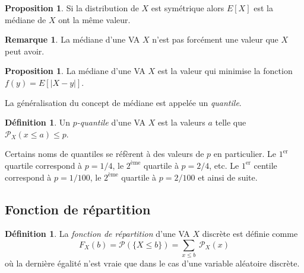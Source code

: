 \documentclass[a4paper,12pt]{report}
\theoremstyle{definition}
\renewcommand{\(}{\left(}
\renewcommand{\)}{\right)}
\renewcommand{\P}{\mathcal{P}}
\renewcommand{\t}{\text}
\renewcommand{\d}{\textit}
\newtheorem{defn}[thm]{Définition}
\newtheorem{rmk}[thm]{Remarque}
\newtheorem{prop}[thm]{Proposition}
\begin{document}
            \begin{leftbar}
            \begin{prop}
                Si la distribution de $X$ est symétrique alors $E[X]$ est la médiane de $X$ ont la même valeur.
            \end{prop}
            \end{leftbar}
            
            \begin{rmk}
                La médiane d'une VA $X$ n'est pas forcément une valeur que $X$ peut avoir.
            \end{rmk}
            
            \begin{leftbar}
            \begin{prop}
                La médiane d'une VA $X$ est la valeur qui minimise la fonction $f(y) = E[|X-y|]$.
            \end{prop}
            \end{leftbar}
    
            La généralisation du concept de médiane est appelée un \textit{quantile}.
            
            \begin{leftbar}
                \begin{defn}
                    Un \d{$p$-quantile} d'une VA $X$ est la valeurs $a$ telle que $\P_X(x\leq a) \leq p$.
                \end{defn}
            \end{leftbar}
            
            Certains noms de quantiles se réfèrent à des valeurs de $p$ en particulier. Le $1^{\t{er}}$ quartile correspond à $p = 1/4$, le $2^{\t{ème}}$ quartile à $p = 2/4$, etc. Le $1^{\t{er}}$ centile correspond à $p = 1/100$, le $2^{\t{ème}}$ quartile à $p = 2/100$ et ainsi de suite.

        \subsection{Fonction de répartition}    
            
            \begin{leftbar}
                \begin{defn} 
                La \d{fonction de répartition} d'une VA $X$ discrète est définie comme
                    $$F_X(b) = \P(\{X\leq b\}) = \sum_{x\leq b}~\P_X(x)$$
                    où la dernière égalité n'est vraie que dans le cas d'une variable aléatoire discrète.
                \end{defn}
            \end{leftbar}
            
\end{document}
